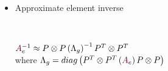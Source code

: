 \documentclass{beamer}
\begin{document}
\begin{frame}
\begin{center}
\begin{itemize}
\item Approximate element inverse

~\\

\begin{center}

${\color{burgundy}A}_e^{-1} \approx P \otimes P \left( \Lambda_g \right)^{-1} P^T \otimes P^T$\\
where $\Lambda_g = diag \left( P^T \otimes P^T \left( {\color{burgundy}A}_e \right) P \otimes P \right)$

\end{center}

~\\

\end{itemize}

\end{center}
\end{frame}

\end{document}
